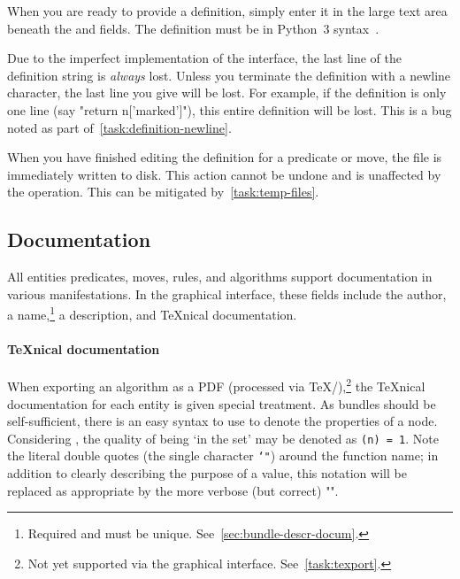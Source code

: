 When you are ready to provide a definition,
  simply enter it in the large text area beneath the
   and  fields.
The definition must be in Python~3 syntax~\autocite{python3:ref}.
\begin{warning}
  Due to the imperfect implementation of the interface,
    the last line of the definition string is \emph{always} lost.
  Unless you terminate the definition with a newline character,
    the last line you give will be lost.
  For example, if the definition is only one line (say "return n['marked']"),
    this entire definition will be lost.
  This is a bug noted as part of~\autoref{task:definition-newline}.
\end{warning}

\begin{warning}
  When you have finished editing the definition for a predicate or move,
    the file is immediately written to disk.
  This action cannot be undone and is unaffected by the  operation.
  This can be mitigated by~\autoref{task:temp-files}.
\end{warning}

\subsection{Documentation}
All entities \Dash predicates, moves, rules, and algorithms \Dash support documentation in various manifestations.
In the graphical interface, these fields include the author,
  a name,\footnote{Required and must be unique.  See~\autoref{sec:bundle-descr-docum}.}
  a description, and \TeX nical documentation.
\paragraph{\TeX nical documentation}
When exporting an algorithm as a PDF (processed via \TeX\slash\TikZ),\footnote{%
  Not yet supported via the graphical interface.
  See~\autoref{task:texport}.}
  the \TeX nical documentation for each entity is given special treatment.
As bundles should be self-sufficient,
  there is an easy syntax to use to denote the properties of a node.
Considering , the quality of being \enquote*{in the set}
  may be denoted as \texttt{(n) = 1}.
Note the literal double quotes (the single character \texttt{\char`"}) around the function name;
  in addition to clearly describing the purpose of a value,
  this notation will be replaced as appropriate by
  the more verbose (but correct) "".

